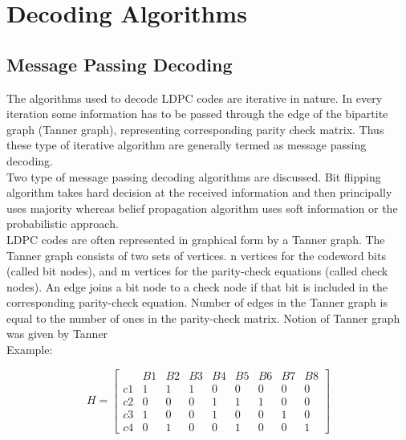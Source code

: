 
\chapter{Decoding Algorithms} 

\label{Chapter3} 


\section{Message Passing Decoding}


The algorithms used to decode LDPC codes are iterative in nature. In every iteration some information has to be passed through the edge of the bipartite graph (Tanner graph), representing corresponding parity check matrix. Thus these type of iterative algorithm are generally termed as message passing decoding\cite{9}.\\
Two type of message passing decoding algorithms are discussed. Bit flipping algorithm takes hard decision at the received information and then principally uses majority whereas belief propagation algorithm uses soft information or the probabilistic approach.\\
LDPC codes are often represented in graphical form by a Tanner graph.
The Tanner graph consists of two sets of vertices.
n vertices for the codeword
bits (called bit nodes), and m vertices for the parity-check equations (called
check nodes).
An edge joins a bit node to a check node if that bit is included
in the corresponding parity-check equation. Number of edges in the
Tanner graph is equal to the number of ones in the parity-check matrix. Notion of Tanner graph was given by Tanner \\
Example:


\[
 H =  \left[ \begin{array} {c|cccccccc} 
  &    B1 &   B2 &   B3 &  B4  &  B5  &  B6  &  B7  &  B8 \\ \hline
c1 &    1  &   1  &   1  &   0  &   0  &   0  &   0  &   0 \\
c2 &    0  &   0  &   0  &   1  &   1  &   1  &   0  &   0 \\ 
c3 &    1  &   0  &   0  &   1  &   0  &   0  &   1  &   0 \\
c4 &    0  &   1  &   0  &   0  &   1  &   0  &   0  &   1 \end{array} \right] 
\]			

